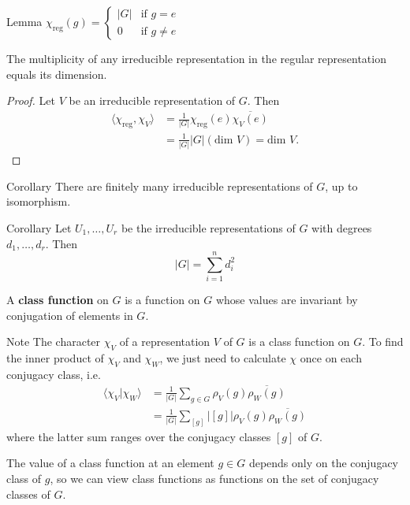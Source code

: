 \begin{frame}
\begin{block}{Lemma}
$\chi_{\text{reg}}(g) = \begin{cases} |G| &\text{if } g=e \\ 0 &\text{if } g \neq e \end{cases}$
\end{block}
\begin{proposition}
The multiplicity of any irreducible representation in the regular representation equals its dimension.
\end{proposition}
\begin{proof}
Let $V$ be an irreducible representation of $G$.  Then
\begin{align*}
\langle \chi_{\text{reg}}, \chi_V \rangle &= \frac{1}{|G|} \chi_{\text{reg}}(e) \overline{\chi_V (e)} \\
&= \frac{1}{|G|} |G| (\text{dim } V)= \text{dim } V.
\end{align*}
\end{proof}
\end{frame}

\begin{frame}
\begin{block}{Corollary}
There are finitely many irreducible representations of $G$, up to isomorphism.
\end{block}
\begin{block}{Corollary}
Let $U_1, \ldots, U_r$ be the irreducible representations of $G$ with degrees $d_1, \ldots, d_r$.  Then
\[ |G| = \sum_{i=1}^n d_i^2 \]
\end{block}
\end{frame}



\begin{frame}
\begin{definition}
A \textbf{class function} on $G$ is a function on $G$ whose values are invariant by conjugation of elements in $G$. 
\end{definition}
\begin{block}{Note}
The character $\chi_V$ of a representation $V$ of $G$ is a class function on $G$. To find the inner product of $\chi_V$ and $\chi_W$, we just need to calculate $\chi$ once on each conjugacy class, i.e. 
\begin{align*}
\langle \chi_V | \chi_W \rangle &= \frac{1}{|G|} \sum_{g \in G} \rho_V (g) \overline{\rho_W (g)} \\
&=  \frac{1}{|G|} \sum_{[g]} |[g]|   \rho_V (g) \overline{\rho_W (g)}
\end{align*}
where the latter sum ranges over the conjugacy classes $[g]$ of $G$.
\end{block}
\end{frame}
\begin{note}
 The value of a class function at an element $g \in G$ depends only on the conjugacy class of $g$, so we can view class functions as functions on the set of conjugacy classes of $G$.
 \end{note}

